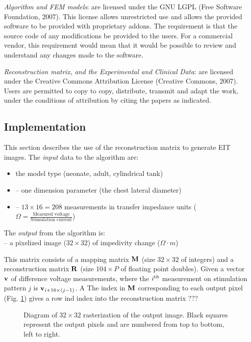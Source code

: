 \documentclass[letterpaper,twocolumn,11pt]{article}
\newcommand{\vB}{\mbox{$\bf v$}}
\newcommand{\RB}{\mbox{$\bf R$}}
\newcommand{\MB}{\mbox{$\bf M$}}
\begin{document}
{\em Algorithm and FEM models}:
   are licensed under the GNU LGPL (Free Software Foundation, 2007).
   This license allows
   unrestricted use and allows the provided software to
   be provided with proprietary addons. The requirement is
   that the source code of any modifications be provided to
   the users. For a commercial vendor, this requirement would
   mean that it would be possible to review and understand any
   changes made to the software.

{\em Reconstruction matrix, and the Experimental and Clinical Data}:
   are licensed under the Creative Commons Attribution
   License (Creative Commons, 2007). Users are permitted
   to copy to copy, distribute, transmit and adapt the work,
   under the conditions of attribution by citing the
   papers as indicated.

\subsection{Implementation }
This section describes the use of the reconstruction
matrix to generate EIT images.
The {\em input} data to the algorithm are:
\begin{itemize}
\item[]
the model type (neonate, adult, cylindrical tank) 
\item[]
   -- one dimension parameter (the chest lateral diameter) 
\item[]
   -- $13\times 16=208$ measurements in transfer impedance units
      ($\Omega = \frac{\mbox{Measured voltage}}
                      {\mbox{Stimulation current}}$)
\end{itemize}

The {\em output} from the algorithm is:
\\
   -- a pixelized image ($32\times 32$) of 
      impedivity change ($\Omega \cdot m$)


      This matrix consists of a mapping matrix $\MB$ (size $32\times 32$ of
      integers) and a reconstruction matrix $\RB$ (size $104\times P$ of
      floating point doubles).
      Given a vector $\vB$ of difference voltage measurements, where
      the $i^{\rm th}$ measurement on stimulation pattern $j$ is
      $\vB_{i+16\times(j-1)}$. A 
      The index in $\MB$ corresponding to each output pixel
      (Fig. \ref{fig:reconst_detail}) gives a row ind index into the
      reconstruction matrix 
???

\begin{figure}[bhtp]
\begin{center}

\caption{ \label{fig:reconst_detail}
Diagram of $32\times 32$ rasterization of the output image. Black
squares represent the output pixels and are numbered from top
to bottom, left to right.
}
\end{center}
\end{figure}
\end{document}
